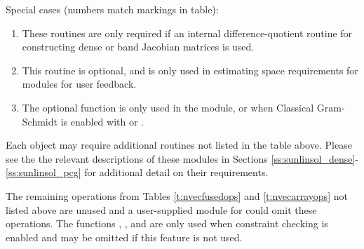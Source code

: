 Special cases (numbers match markings in table):
\begin{enumerate}
\item These routines are only required if an internal
  difference-quotient routine for constructing dense or band
  Jacobian matrices is used.
\item This routine is optional, and is only used in estimating
  space requirements for {\cvodes} modules for user feedback.
\item The optional function  is only used in the
  {\sunnonlinsolfixedpoint} module, or when Classical Gram-Schmidt is
  enabled with {\spgmr} or {\spfgmr}.
\end{enumerate}

Each {\sunlinsol} object may require additional {\nvector} routines
not listed in the table above.  Please see the the relevant
descriptions of these modules in Sections
\ref{ss:sunlinsol_dense}-\ref{ss:sunlinsol_pcg} for additional detail
on their {\nvector} requirements.

The remaining operations from
Tables \ref{t:nvecfusedops} and \ref{t:nvecarrayops} not listed above
are unused and a user-supplied {\nvector} module for {\cvode} could
omit these operations.  The functions ,
, and  are only used when
constraint checking is enabled and may be omitted if this feature is
not used.













